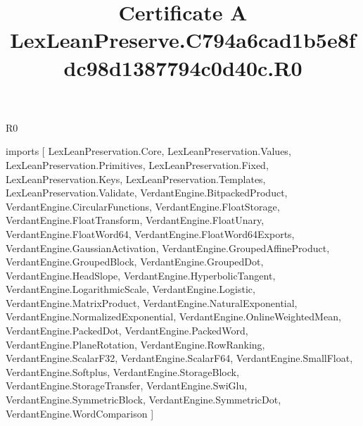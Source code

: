 \begin{lexlean}{R0}
\title{Certificate A LexLeanPreserve.C794a6cad1b5e8fdc98d1387794c0d40c.R0}
\begin{coremodule}
imports [
  LexLeanPreservation.Core,
  LexLeanPreservation.Values,
  LexLeanPreservation.Primitives,
  LexLeanPreservation.Fixed,
  LexLeanPreservation.Keys,
  LexLeanPreservation.Templates,
  LexLeanPreservation.Validate,
  VerdantEngine.BitpackedProduct,
  VerdantEngine.CircularFunctions,
  VerdantEngine.FloatStorage,
  VerdantEngine.FloatTransform,
  VerdantEngine.FloatUnary,
  VerdantEngine.FloatWord64,
  VerdantEngine.FloatWord64Exports,
  VerdantEngine.GaussianActivation,
  VerdantEngine.GroupedAffineProduct,
  VerdantEngine.GroupedBlock,
  VerdantEngine.GroupedDot,
  VerdantEngine.HeadSlope,
  VerdantEngine.HyperbolicTangent,
  VerdantEngine.LogarithmicScale,
  VerdantEngine.Logistic,
  VerdantEngine.MatrixProduct,
  VerdantEngine.NaturalExponential,
  VerdantEngine.NormalizedExponential,
  VerdantEngine.OnlineWeightedMean,
  VerdantEngine.PackedDot,
  VerdantEngine.PackedWord,
  VerdantEngine.PlaneRotation,
  VerdantEngine.RowRanking,
  VerdantEngine.ScalarF32,
  VerdantEngine.ScalarF64,
  VerdantEngine.SmallFloat,
  VerdantEngine.Softplus,
  VerdantEngine.StorageBlock,
  VerdantEngine.StorageTransfer,
  VerdantEngine.SwiGlu,
  VerdantEngine.SymmetricBlock,
  VerdantEngine.SymmetricDot,
  VerdantEngine.WordComparison
]


\end{coremodule}
\end{lexlean}
